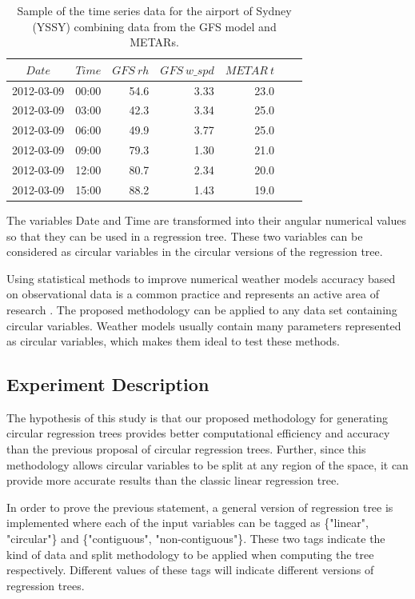 \documentclass[times,twocolumn,final,authoryear]{elsarticle}
\begin{document}
\begin{table}[t]
\caption{Sample of the time series data for the airport of Sydney (YSSY) combining data from the GFS model and METARs.}\label{t2}
\begin{center}
\begin{tabular}{crrrrrr}
\hline\hline
$Date$ & $Time$ & $GFS\ rh$ & $GFS\ w\_spd$ & $METAR\ t$\\
\hline
2012-03-09 & 00:00 & 54.6 & 3.33 & 23.0\\
2012-03-09 & 03:00 & 42.3 & 3.34 & 25.0\\
2012-03-09 & 06:00 & 49.9 & 3.77 & 25.0\\
2012-03-09 & 09:00 & 79.3 & 1.30 & 21.0\\
2012-03-09 & 12:00 & 80.7 & 2.34 & 20.0\\
2012-03-09 & 15:00 & 88.2 & 1.43 & 19.0\\
\hline
\end{tabular}
\end{center}
\end{table}

The variables Date and Time are transformed into their angular numerical values so that they can be used in a regression tree. These two variables can be considered as circular variables in the circular versions of the regression tree.

Using statistical methods to improve numerical weather models accuracy based on observational data is a common practice and represents an active area of research \citep{Larraondoetal2014, Salamehetal2009}. The proposed methodology can be applied to any data set containing circular variables. Weather models usually contain many parameters represented as circular variables, which makes them ideal to test these methods.

\subsection{Experiment Description}

The hypothesis of this study is that our proposed methodology for generating circular regression trees provides better computational efficiency and accuracy than the previous proposal of circular regression trees. Further, since this methodology allows circular variables to be split at any region of the space, it can provide more accurate results than the classic linear regression tree.

In order to prove the previous statement, a general version of regression tree is implemented where each of the input variables can be tagged as \{"linear", "circular"\} and \{"contiguous", "non-contiguous"\}. These two tags indicate the kind of data and split methodology to be applied when computing the tree respectively. Different values of these tags will indicate different versions of regression trees.
\end{document}

